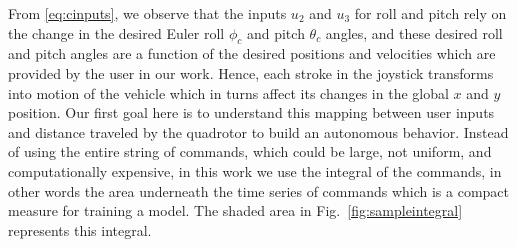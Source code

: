 \documentclass[letterpaper, 10 pt, conference]{ieeeconf}  %
\newcommand\NB[1]{$\spadesuit$\footnote{NB: #1}}
\begin{document}


From \eqref{eq:cinputs}, we observe that the inputs $u_2$ and $u_3$ for roll and pitch rely on the change in the desired Euler roll $\phi_c$ and pitch $\theta_c$ angles, and these desired roll and pitch angles are a function of the desired positions and velocities which are provided by the user in our work. 
Hence, each stroke in the joystick transforms into motion of the vehicle which in turns affect its changes in the global $x$ and $y$ position. Our first goal here is to understand this mapping between user inputs and distance traveled by the quadrotor to build an autonomous behavior. Instead of using the entire string of commands, which could be large, not uniform, and computationally expensive, in this work we use the integral of the commands, in other words the area underneath the time series of commands which is a compact measure for training a model. The shaded area in Fig.~\ref{fig:sampleintegral} represents this integral. 


\end{document}
